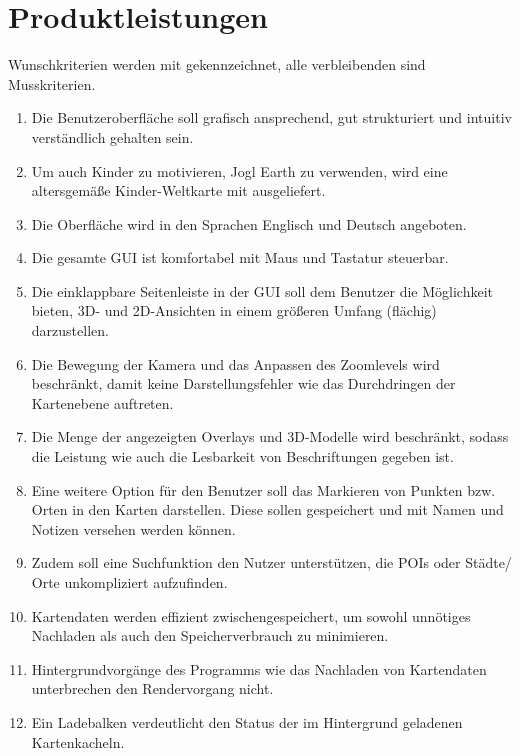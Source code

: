 \documentclass[10pt]{scrreprt}
\begin{document}
\chapter{Produktleistungen}

\renewcommand{\muss}{\renewcommand{\labelenumi}{\textbf{/L\numprint{\theenumi}0/}}}
\renewcommand{\wunsch}{\renewcommand{\labelenumi}{\textbf{/L\numprint{\theenumi}0W/}}}
\muss

Wunschkriterien werden mit \W  gekennzeichnet, alle verbleibenden sind Musskriterien.

\begin{enumerate}[leftmargin=2.5cm]
\item Die Benutzeroberfläche soll grafisch ansprechend, gut strukturiert und intuitiv verständlich gehalten sein.
\wunsch
\item Um auch Kinder zu motivieren, Jogl Earth zu verwenden, wird eine altersgemäße Kinder-Weltkarte mit ausgeliefert.
\muss
\item Die Oberfläche wird in den Sprachen Englisch und Deutsch angeboten.
\item Die gesamte GUI ist komfortabel mit Maus und Tastatur steuerbar.
\item Die einklappbare Seitenleiste in der GUI soll dem Benutzer die Möglichkeit bieten, 3D- und 2D-Ansichten in einem größeren Umfang (flächig) darzustellen.
\item Die Bewegung der Kamera und das Anpassen des Zoomlevels wird beschränkt, damit keine Darstellungsfehler wie das Durchdringen der Kartenebene auftreten.
\item Die Menge der angezeigten Overlays und 3D-Modelle wird beschränkt, sodass die Leistung wie auch die Lesbarkeit von Beschriftungen gegeben ist.
\item Eine weitere Option für den Benutzer soll das Markieren von Punkten bzw. Orten in den Karten darstellen. Diese sollen gespeichert und mit Namen und Notizen versehen werden können.
\item Zudem soll eine Suchfunktion den Nutzer unterstützen, die POIs oder Städte/ Orte unkompliziert aufzufinden.
\item Kartendaten werden effizient zwischengespeichert, um sowohl unnötiges Nachladen als auch den Speicherverbrauch zu minimieren.
\item Hintergrundvorgänge des Programms wie das Nachladen von Kartendaten unterbrechen den Rendervorgang nicht.
\item Ein Ladebalken verdeutlicht den Status der im Hintergrund geladenen Kartenkacheln.

\end{enumerate}
\end{document}
